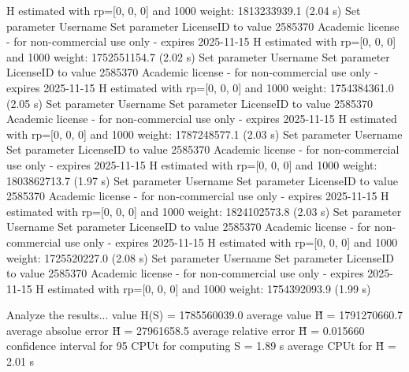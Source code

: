   H estimated with rp=[0, 0, 0] and 1000 weight:  1813233939.1  (2.04 s)
Set parameter Username
Set parameter LicenseID to value 2585370
Academic license - for non-commercial use only - expires 2025-11-15
  H estimated with rp=[0, 0, 0] and 1000 weight:  1752551154.7  (2.02 s)
Set parameter Username
Set parameter LicenseID to value 2585370
Academic license - for non-commercial use only - expires 2025-11-15
  H estimated with rp=[0, 0, 0] and 1000 weight:  1754384361.0  (2.05 s)
Set parameter Username
Set parameter LicenseID to value 2585370
Academic license - for non-commercial use only - expires 2025-11-15
  H estimated with rp=[0, 0, 0] and 1000 weight:  1787248577.1  (2.03 s)
Set parameter Username
Set parameter LicenseID to value 2585370
Academic license - for non-commercial use only - expires 2025-11-15
  H estimated with rp=[0, 0, 0] and 1000 weight:  1803862713.7  (1.97 s)
Set parameter Username
Set parameter LicenseID to value 2585370
Academic license - for non-commercial use only - expires 2025-11-15
  H estimated with rp=[0, 0, 0] and 1000 weight:  1824102573.8  (2.03 s)
Set parameter Username
Set parameter LicenseID to value 2585370
Academic license - for non-commercial use only - expires 2025-11-15
  H estimated with rp=[0, 0, 0] and 1000 weight:  1725520227.0  (2.08 s)
Set parameter Username
Set parameter LicenseID to value 2585370
Academic license - for non-commercial use only - expires 2025-11-15
  H estimated with rp=[0, 0, 0] and 1000 weight:  1754392093.9  (1.99 s)

Analyze the results...
  value H(S)                  = 1785560039.0 
  average value H̃             = 1791270660.7 
  average absolue error H̃     = 27961658.5 
  average relative error H̃    = 0.015660 
  confidence interval for 95%
  CPUt for computing S         = 1.89 s
  average CPUt for H̃           = 2.01 s

